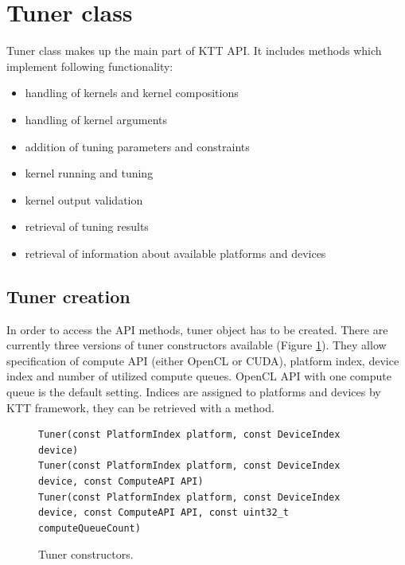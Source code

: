 \documentclass
[
    digital, %
    oneside, %
    table, %
    nolof, %
    nolot, %
    nocover %
]{fithesis3}
\begin{document}
\section{Tuner class}
Tuner class makes up the main part of KTT API. It includes methods which implement following functionality:
\begin{itemize}
    \item handling of kernels and kernel compositions
    \item handling of kernel arguments
    \item addition of tuning parameters and constraints
    \item kernel running and tuning
    \item kernel output validation
    \item retrieval of tuning results
    \item retrieval of information about available platforms and devices
\end{itemize}

\subsection{Tuner creation}
In order to access the API methods, tuner object has to be created. There are currently three versions of tuner constructors available (Figure 
\ref{ktt-constructors}). They allow specification of compute API (either OpenCL or CUDA), platform index, device index and number of utilized compute
queues. OpenCL API with one compute queue is the default setting. Indices are assigned to platforms and devices by KTT framework, they can be retrieved
with a method.

\begin{figure}
\begin{adjustwidth}{-1cm}{-1cm}
\begin{lstlisting}
Tuner(const PlatformIndex platform, const DeviceIndex device)
Tuner(const PlatformIndex platform, const DeviceIndex device, const ComputeAPI API)
Tuner(const PlatformIndex platform, const DeviceIndex device, const ComputeAPI API, const uint32_t computeQueueCount)
\end{lstlisting}
\caption{Tuner constructors.}
\label{ktt-constructors}
\end{adjustwidth}
\end{figure}
\end{document}
